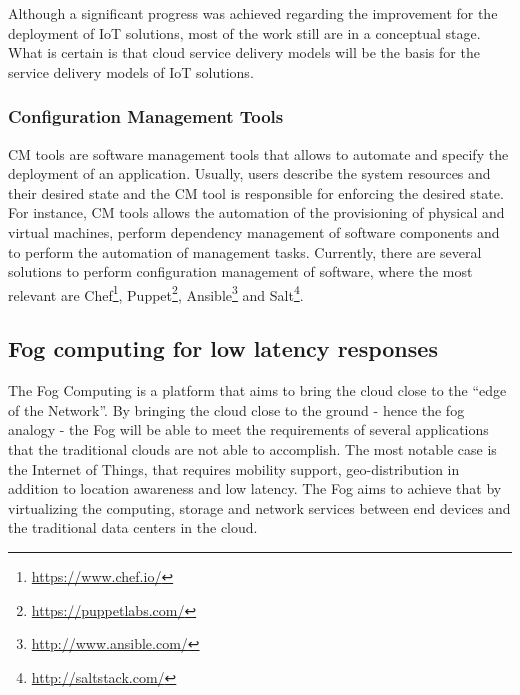 Although a significant progress was achieved regarding the improvement for the deployment of \gls{IoT}
solutions, most of the work still are in a conceptual stage. What is certain is that cloud service
delivery models will be the basis for the service delivery models of \gls{IoT} solutions.\\

\subsubsection{Configuration Management Tools}
\label{subs:cm_tools}
\gls{CM} tools are software management tools that allows to automate and specify the deployment of an
application. Usually, users describe the system resources and their desired state and the \gls{CM}
tool is responsible for enforcing the desired state. For instance, \gls{CM} tools allows the automation
of the provisioning of physical and virtual machines, perform dependency management of software
components and to perform the automation of management tasks. Currently, there are several solutions
to perform configuration management of software, where the most relevant are Chef\footnote{\url{https://www.chef.io/}},
Puppet\footnote{\url{https://puppetlabs.com/}}, Ansible\footnote{\url{http://www.ansible.com/}} and
Salt\footnote{\url{http://saltstack.com/}}.\\

\subsection{Fog computing for low latency responses}
\label{sub:fog_computing}
The Fog Computing \cite{bonomi2012fog} is a platform that aims to bring the cloud close to the ``edge
of the Network''. By bringing the cloud close to the ground - hence the fog analogy - the Fog will be
able to meet the requirements of several applications that the traditional clouds are not able to
accomplish. The most notable case is the Internet of Things, that requires mobility support,
geo-distribution in addition to location awareness and low latency. The Fog aims to achieve that by
virtualizing the computing, storage and network services between end devices and the
traditional data centers in the cloud.\\

